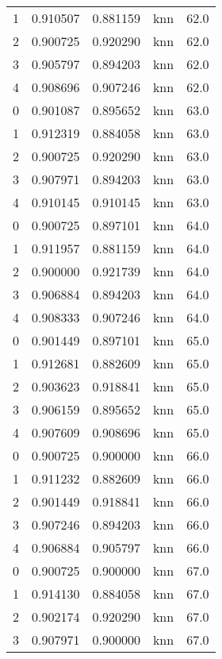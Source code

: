 \begin{tabular}{rrrlr}
     1 & 0.910507 & 0.881159 &      knn &       62.0 \\
     2 & 0.900725 & 0.920290 &      knn &       62.0 \\
     3 & 0.905797 & 0.894203 &      knn &       62.0 \\
     4 & 0.908696 & 0.907246 &      knn &       62.0 \\
     0 & 0.901087 & 0.895652 &      knn &       63.0 \\
     1 & 0.912319 & 0.884058 &      knn &       63.0 \\
     2 & 0.900725 & 0.920290 &      knn &       63.0 \\
     3 & 0.907971 & 0.894203 &      knn &       63.0 \\
     4 & 0.910145 & 0.910145 &      knn &       63.0 \\
     0 & 0.900725 & 0.897101 &      knn &       64.0 \\
     1 & 0.911957 & 0.881159 &      knn &       64.0 \\
     2 & 0.900000 & 0.921739 &      knn &       64.0 \\
     3 & 0.906884 & 0.894203 &      knn &       64.0 \\
     4 & 0.908333 & 0.907246 &      knn &       64.0 \\
     0 & 0.901449 & 0.897101 &      knn &       65.0 \\
     1 & 0.912681 & 0.882609 &      knn &       65.0 \\
     2 & 0.903623 & 0.918841 &      knn &       65.0 \\
     3 & 0.906159 & 0.895652 &      knn &       65.0 \\
     4 & 0.907609 & 0.908696 &      knn &       65.0 \\
     0 & 0.900725 & 0.900000 &      knn &       66.0 \\
     1 & 0.911232 & 0.882609 &      knn &       66.0 \\
     2 & 0.901449 & 0.918841 &      knn &       66.0 \\
     3 & 0.907246 & 0.894203 &      knn &       66.0 \\
     4 & 0.906884 & 0.905797 &      knn &       66.0 \\
     0 & 0.900725 & 0.900000 &      knn &       67.0 \\
     1 & 0.914130 & 0.884058 &      knn &       67.0 \\
     2 & 0.902174 & 0.920290 &      knn &       67.0 \\
     3 & 0.907971 & 0.900000 &      knn &       67.0 \\

\end{tabular}

